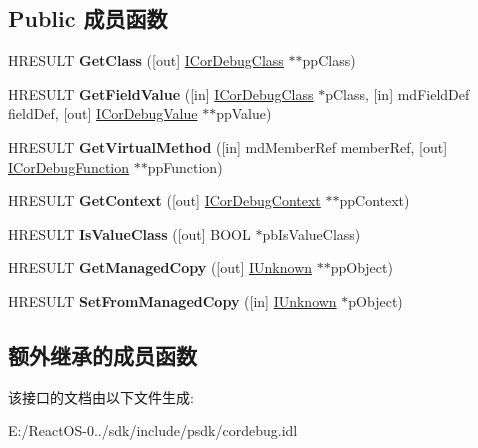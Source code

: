 \subsection*{Public 成员函数}
\begin{DoxyCompactItemize}
\item 
\mbox{\label{interface_i_cor_debug_object_value_aa518cde25ec92c3b1329303d52f49930}} 
H\+R\+E\+S\+U\+LT {\bfseries Get\+Class} (\mbox{[}out\mbox{]} \hyperlink{interface_i_cor_debug_class}{I\+Cor\+Debug\+Class} $\ast$$\ast$pp\+Class)
\item 
\mbox{\label{interface_i_cor_debug_object_value_acaf15250f973899a7c0d8d967c2599df}} 
H\+R\+E\+S\+U\+LT {\bfseries Get\+Field\+Value} (\mbox{[}in\mbox{]} \hyperlink{interface_i_cor_debug_class}{I\+Cor\+Debug\+Class} $\ast$p\+Class, \mbox{[}in\mbox{]} md\+Field\+Def field\+Def, \mbox{[}out\mbox{]} \hyperlink{interface_i_cor_debug_value}{I\+Cor\+Debug\+Value} $\ast$$\ast$pp\+Value)
\item 
\mbox{\label{interface_i_cor_debug_object_value_a0513eafbc00d984f437e076dcc10f235}} 
H\+R\+E\+S\+U\+LT {\bfseries Get\+Virtual\+Method} (\mbox{[}in\mbox{]} md\+Member\+Ref member\+Ref, \mbox{[}out\mbox{]} \hyperlink{interface_i_cor_debug_function}{I\+Cor\+Debug\+Function} $\ast$$\ast$pp\+Function)
\item 
\mbox{\label{interface_i_cor_debug_object_value_a2a33f1a2bcbd8e9012eefaf942fdff08}} 
H\+R\+E\+S\+U\+LT {\bfseries Get\+Context} (\mbox{[}out\mbox{]} \hyperlink{interface_i_cor_debug_context}{I\+Cor\+Debug\+Context} $\ast$$\ast$pp\+Context)
\item 
\mbox{\label{interface_i_cor_debug_object_value_ad561401153a200d05b7019d7b4857c09}} 
H\+R\+E\+S\+U\+LT {\bfseries Is\+Value\+Class} (\mbox{[}out\mbox{]} B\+O\+OL $\ast$pb\+Is\+Value\+Class)
\item 
\mbox{\label{interface_i_cor_debug_object_value_adc9b9063cedd7377ad7ce7471a4b7bdc}} 
H\+R\+E\+S\+U\+LT {\bfseries Get\+Managed\+Copy} (\mbox{[}out\mbox{]} \hyperlink{interface_i_unknown}{I\+Unknown} $\ast$$\ast$pp\+Object)
\item 
\mbox{\label{interface_i_cor_debug_object_value_aa2df9401cb84ac98103883de91fd80cd}} 
H\+R\+E\+S\+U\+LT {\bfseries Set\+From\+Managed\+Copy} (\mbox{[}in\mbox{]} \hyperlink{interface_i_unknown}{I\+Unknown} $\ast$p\+Object)
\end{DoxyCompactItemize}
\subsection*{额外继承的成员函数}


该接口的文档由以下文件生成\+:\begin{DoxyCompactItemize}
\item 
E\+:/\+React\+O\+S-\/0../sdk/include/psdk/cordebug.\+idl\end{DoxyCompactItemize}
